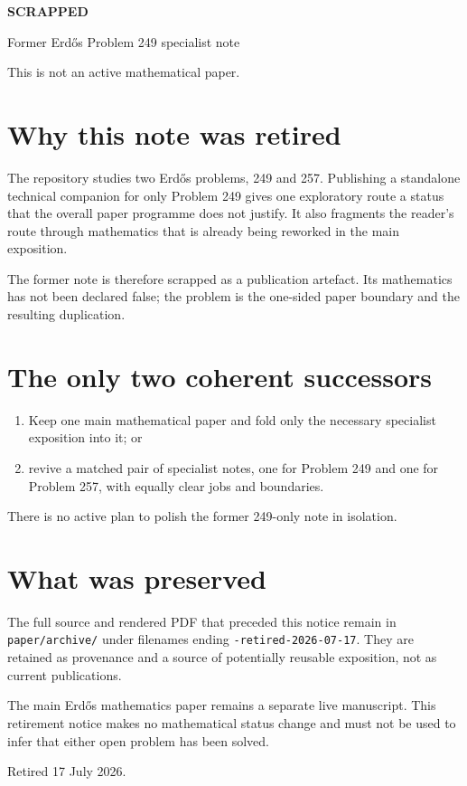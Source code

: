 \documentclass[11pt]{article}
\begin{document}
\begin{center}
{\Huge\bfseries\color{BrickRed} SCRAPPED}\par
\vspace{1em}
{\Large Former Erd\H{o}s Problem 249 specialist note}\par
\vspace{0.8em}
{\large This is not an active mathematical paper.}
\end{center}

\section*{Why this note was retired}

The repository studies two Erd\H{o}s problems, 249 and 257. Publishing a
standalone technical companion for only Problem 249 gives one exploratory
route a status that the overall paper programme does not justify. It also
fragments the reader's route through mathematics that is already being
reworked in the main exposition.

The former note is therefore scrapped as a publication artefact. Its
mathematics has not been declared false; the problem is the one-sided paper
boundary and the resulting duplication.

\section*{The only two coherent successors}

\begin{enumerate}
  \item Keep one main mathematical paper and fold only the necessary
  specialist exposition into it; or
  \item revive a matched pair of specialist notes, one for Problem 249 and
  one for Problem 257, with equally clear jobs and boundaries.
\end{enumerate}

There is no active plan to polish the former 249-only note in isolation.

\section*{What was preserved}

The full source and rendered PDF that preceded this notice remain in
\texttt{paper/archive/} under filenames ending
\texttt{-retired-2026-07-17}. They are retained as provenance and a source of
potentially reusable exposition, not as current publications.

The main Erd\H{o}s mathematics paper remains a separate live manuscript. This
retirement notice makes no mathematical status change and must not be used to
infer that either open problem has been solved.

\vfill
\noindent Retired 17 July 2026.
\end{document}
